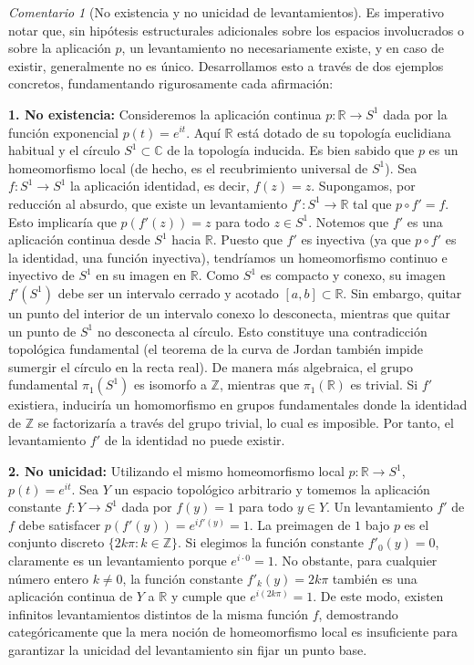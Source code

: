 \documentclass[11pt,a4paper]{article}
\theoremstyle{definition}
\theoremstyle{remark}
\newtheorem{observacion}{Comentario}[section]
\numberwithin{equation}{section}
\begin{document}
\begin{observacion}[No existencia y no unicidad de levantamientos]
Es imperativo notar que, sin hipótesis estructurales adicionales sobre los espacios involucrados o sobre la aplicación $p$, un levantamiento no necesariamente existe, y en caso de existir, generalmente no es único. Desarrollamos esto a través de dos ejemplos concretos, fundamentando rigurosamente cada afirmación:

\textbf{1. No existencia:} Consideremos la aplicación continua $p: \mathbb{R} \to S^1$ dada por la función exponencial $p(t) = e^{it}$. Aquí $\mathbb{R}$ está dotado de su topología euclidiana habitual y el círculo $S^1 \subset \mathbb{C}$ de la topología inducida. Es bien sabido que $p$ es un homeomorfismo local (de hecho, es el recubrimiento universal de $S^1$). Sea $f: S^1 \to S^1$ la aplicación identidad, es decir, $f(z) = z$. Supongamos, por reducción al absurdo, que existe un levantamiento $f': S^1 \to \mathbb{R}$ tal que $p \circ f' = f$. Esto implicaría que $p(f'(z)) = z$ para todo $z \in S^1$. Notemos que $f'$ es una aplicación continua desde $S^1$ hacia $\mathbb{R}$. Puesto que $f'$ es inyectiva (ya que $p \circ f'$ es la identidad, una función inyectiva), tendríamos un homeomorfismo continuo e inyectivo de $S^1$ en su imagen en $\mathbb{R}$. Como $S^1$ es compacto y conexo, su imagen $f'(S^1)$ debe ser un intervalo cerrado y acotado $[a, b] \subset \mathbb{R}$. Sin embargo, quitar un punto del interior de un intervalo conexo lo desconecta, mientras que quitar un punto de $S^1$ no desconecta al círculo. Esto constituye una contradicción topológica fundamental (el teorema de la curva de Jordan también impide sumergir el círculo en la recta real). De manera más algebraica, el grupo fundamental $\pi_1(S^1)$ es isomorfo a $\mathbb{Z}$, mientras que $\pi_1(\mathbb{R})$ es trivial. Si $f'$ existiera, induciría un homomorfismo en grupos fundamentales donde la identidad de $\mathbb{Z}$ se factorizaría a través del grupo trivial, lo cual es imposible. Por tanto, el levantamiento $f'$ de la identidad no puede existir.

\textbf{2. No unicidad:} Utilizando el mismo homeomorfismo local $p: \mathbb{R} \to S^1$, $p(t) = e^{it}$. Sea $Y$ un espacio topológico arbitrario y tomemos la aplicación constante $f: Y \to S^1$ dada por $f(y) = 1$ para todo $y \in Y$. Un levantamiento $f'$ de $f$ debe satisfacer $p(f'(y)) = e^{i f'(y)} = 1$. La preimagen de $1$ bajo $p$ es el conjunto discreto $\{ 2k\pi : k \in \mathbb{Z} \}$. Si elegimos la función constante $f'_0(y) = 0$, claramente es un levantamiento porque $e^{i\cdot 0} = 1$. No obstante, para cualquier número entero $k \neq 0$, la función constante $f'_k(y) = 2k\pi$ también es una aplicación continua de $Y$ a $\mathbb{R}$ y cumple que $e^{i (2k\pi)} = 1$. De este modo, existen infinitos levantamientos distintos de la misma función $f$, demostrando categóricamente que la mera noción de homeomorfismo local es insuficiente para garantizar la unicidad del levantamiento sin fijar un punto base.
\end{observacion}
\end{document}
